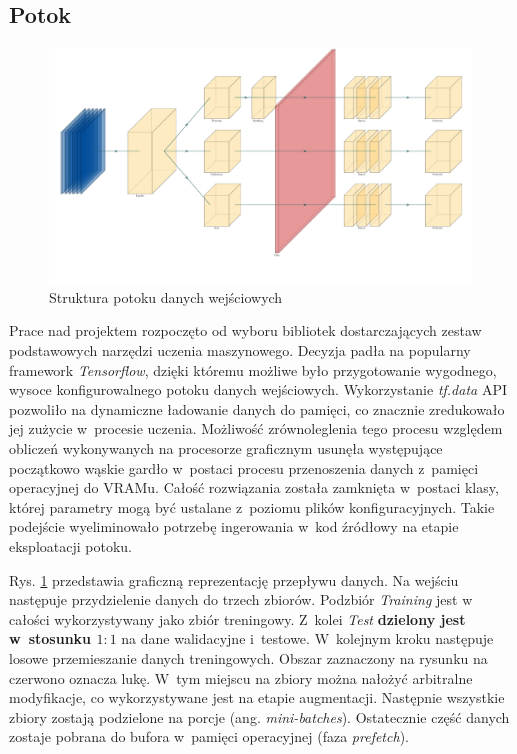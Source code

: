 \subsection{Potok}

\vspace{0.5cm}
\begin{figure}[h]
    \centering
    \includegraphics[scale=0.2]{img/pipe.pdf}
    \caption{Struktura potoku danych wejściowych}
    \label{pipe_img}
\end{figure}
\vspace{0.5cm}

Prace nad projektem rozpoczęto od wyboru bibliotek dostarczających zestaw podstawowych narzędzi uczenia maszynowego. Decyzja padła na popularny framework \textit{Tensorflow}, dzięki któremu możliwe było przygotowanie wygodnego, wysoce konfigurowalnego potoku danych wejściowych. Wykorzystanie \textit{tf.data} API pozwoliło na dynamiczne ładowanie danych do pamięci, co znacznie zredukowało jej zużycie  w~procesie uczenia. Możliwość zrównoleglenia tego procesu względem obliczeń wykonywanych na procesorze graficznym usunęła występujące początkowo wąskie gardło w~postaci procesu przenoszenia danych z~pamięci operacyjnej do VRAMu. Całość rozwiązania została zamknięta w~postaci klasy, której parametry mogą być ustalane z~poziomu plików konfiguracyjnych. Takie podejście wyeliminowało potrzebę ingerowania w~kod źródłowy na etapie eksploatacji potoku. 

Rys. \ref{pipe_img} przedstawia graficzną reprezentację przepływu danych. Na wejściu następuje przydzielenie danych do trzech zbiorów. Podzbiór \textit{Training} jest w całości wykorzystywany jako zbiór treningowy. Z~kolei \textit{Test} \textbf{dzielony jest w~stosunku $1:1$} na dane walidacyjne i~testowe. W~kolejnym kroku następuje losowe przemieszanie danych treningowych. Obszar zaznaczony na rysunku na czerwono oznacza lukę. W~tym miejscu na zbiory można nałożyć arbitralne modyfikacje, co wykorzystywane jest na etapie augmentacji. Następnie wszystkie zbiory zostają podzielone na porcje (ang. \textit{mini-batches}). Ostatecznie część danych zostaje pobrana do bufora w~pamięci operacyjnej (faza \textit{prefetch}).